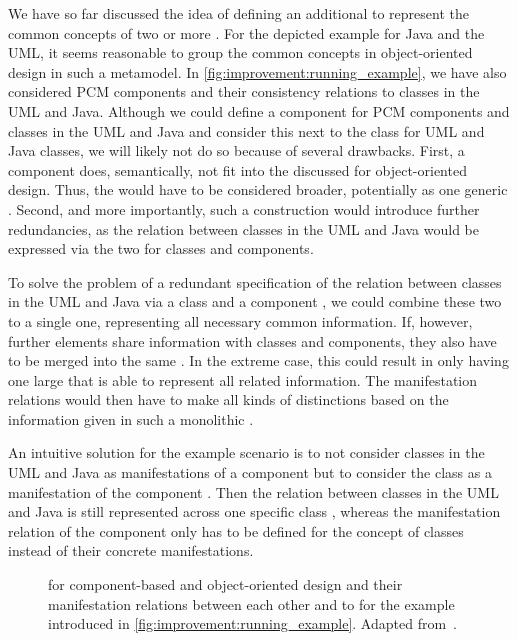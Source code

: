 We have so far discussed the idea of defining an additional \conceptmetamodel to represent the common concepts of two or more \concretemetamodels.
For the depicted example for Java and the \gls{UML}, it seems reasonable to group the common concepts in object-oriented design in such a metamodel.
In \autoref{fig:improvement:running_example}, we have also considered \gls{PCM} components and their consistency relations to classes in the \gls{UML} and Java.
Although we could define a component \commonality for \gls{PCM} components and classes in the \gls{UML} and Java and consider this \commonality next to the class \commonality for \gls{UML} and Java classes, we will likely not do so because of several drawbacks.
First, a component \commonality does, semantically, not fit into the discussed \conceptmetamodel for object-oriented design. Thus, the \conceptmetamodel would have to be considered broader, potentially as one generic \conceptmetamodel.
Second, and more importantly, such a construction would introduce further redundancies, as the relation between classes in the \gls{UML} and Java would be expressed via the two \commonalities for classes and components.

To solve the problem of a redundant specification of the relation between classes in the \gls{UML} and Java via a class and a component \commonality, we could combine these two \commonalities to a single one, representing all necessary common information.
If, however, further elements share information with classes and components, they also have to be merged into the same \commonality.
In the extreme case, this could result in only having one large \commonality that is able to represent all related information.
The manifestation relations would then have to make all kinds of distinctions based on the information given in such a monolithic \commonality.

An intuitive solution for the example scenario is to not consider classes in the \gls{UML} and Java as manifestations of a component \commonality but to consider the class \commonality as a manifestation of the component \commonality.
Then the relation between classes in the \gls{UML} and Java is still represented across one specific class \commonality, whereas the manifestation relation of the component \commonality only has to be defined for the concept of classes instead of their concrete manifestations.

\begin{figure}
    \centering
    
    \caption[Hierarchic composition of \conceptmetamodels]{\Conceptmetamodels for component-based and object-oriented design and their manifestation relations between each other and to \concretemetamodels for the example introduced in \autoref{fig:improvement:running_example}. Adapted from~.}
    \label{fig:improvement:composed_commonalities_example}
\end{figure}


